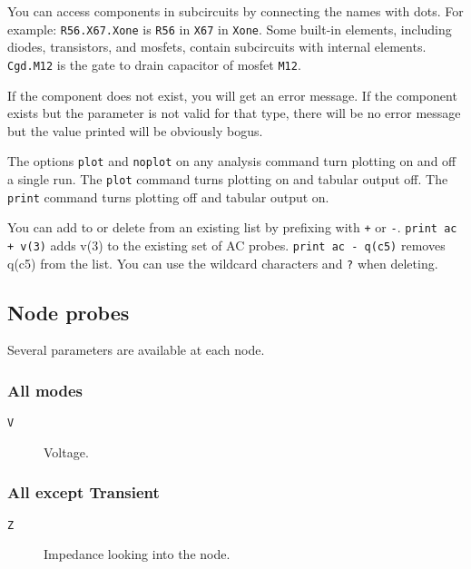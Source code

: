 You can access components in subcircuits by connecting the names with dots.
For example: {\tt R56.X67.Xone} is {\tt R56} in {\tt X67} in {\tt Xone}.
Some built-in elements, including diodes, transistors, and mosfets, contain
subcircuits with internal elements.  {\tt Cgd.M12} is the gate to drain
capacitor of mosfet {\tt M12}.

If the component does not exist, you will get an error message.  If the
component exists but the parameter is not valid for that type, there will be
no error message but the value printed will be obviously bogus.

The options {\tt plot} and {\tt noplot} on any analysis command turn
plotting on and off a single run.  The {\tt plot} command turns 
plotting on and tabular output off.  The {\tt print} command turns plotting 
off and tabular output on.

You can add to or delete from an existing list by prefixing with
{\tt +} or {\tt -}.  {\tt print ac + v(3)} adds v(3) to the existing
set of AC probes.  {\tt print ac - q(c5)} removes q(c5) from the
list.  You can use the wildcard characters {\tt *} and {\tt ?} when
deleting.
\subsection{Node probes}

Several parameters are available at each node.
\subsubsection{All modes}

\begin{description}

\item[{\tt V}] Voltage.

\end{description}
\subsubsection{All except Transient}

\begin{description}

\item[{\tt Z}] Impedance looking into the node.

\end{description}
